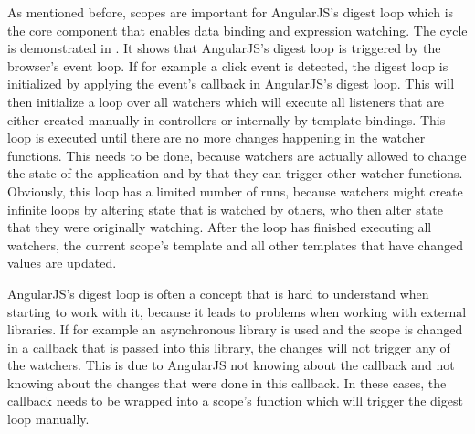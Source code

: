 As mentioned before, scopes are important for AngularJS's digest loop which is the core component that enables data binding and expression watching. The cycle is demonstrated in . It shows that AngularJS's digest loop is triggered by the browser's event loop. If for example a click event is detected, the digest loop is initialized by applying the event's callback in AngularJS's digest loop. This will then initialize a loop over all watchers which will execute all  listeners that are either created manually in controllers or internally by template bindings. This loop is executed until there are no more changes happening in the watcher functions. This needs to be done, because watchers are actually allowed to change the state of the application and by that they can trigger other watcher functions. Obviously, this loop has a limited number of runs, because watchers might create infinite loops by altering state that is watched by others, who then alter state that they were originally watching. After the loop has finished executing all watchers, the current scope's template and all other templates that have changed values are updated.

AngularJS's digest loop is often a concept that is hard to understand when starting to work with it, because it leads to problems when working with external libraries. If for example an asynchronous library is used and the scope is changed in a callback that is passed into this library, the changes will not trigger any of the watchers. This is due to AngularJS not knowing about the callback and not knowing about the changes that were done in this callback. In these cases, the callback needs to be wrapped into a scope's  function which will trigger the digest loop manually.
